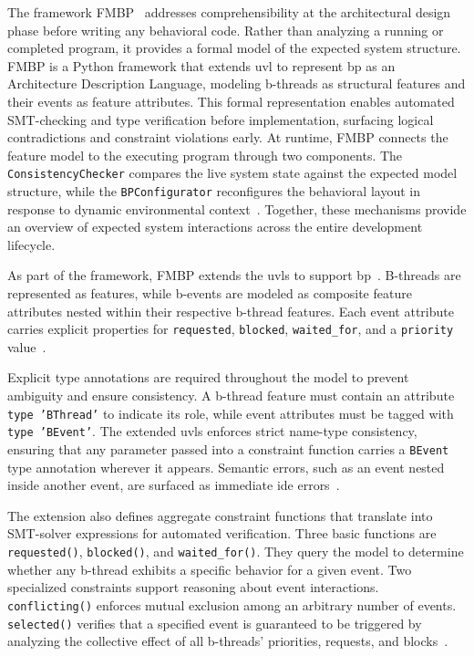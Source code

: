 The framework FMBP~\cite{felber_comprehensible_2025} addresses comprehensibility at the architectural design phase before writing any behavioral code.
Rather than analyzing a running or completed program, it provides a formal model of the expected system structure.
FMBP is a Python framework that extends \gls{uvl} to represent \gls{bp} as an Architecture Description Language, modeling b-threads as structural features and their events as feature attributes.
This formal representation enables automated SMT-checking and type verification before implementation, surfacing logical contradictions and constraint violations early.
At runtime, FMBP connects the feature model to the executing program through two components.
The \texttt{ConsistencyChecker} compares the live system state against the expected model structure, while the \texttt{BPConfigurator} reconfigures the behavioral layout in response to dynamic environmental context~\cite{felber_comprehensible_2025}.
Together, these mechanisms provide an overview of expected system interactions across the entire development lifecycle.
 
As part of the framework, FMBP extends the \gls{uvls} to support \gls{bp}~\cite{felber_tfelbruvl-bp-lsp_2025}.
B-threads are represented as features, while b-events are modeled as composite feature attributes nested within their respective b-thread features.
Each event attribute carries explicit properties for \texttt{requested}, \texttt{blocked}, \texttt{waited\_for}, and a \texttt{priority} value~\cite{felber_comprehensible_2025}.

Explicit type annotations are required throughout the model to prevent ambiguity and ensure consistency.
A b-thread feature must contain an attribute \texttt{type 'BThread'} to indicate its role, while event attributes must be tagged with \texttt{type 'BEvent'}.
The extended \gls{uvls} enforces strict name-type consistency, ensuring that any parameter passed into a constraint function carries a \texttt{BEvent} type annotation wherever it appears.
Semantic errors, such as an event nested inside another event, are surfaced as immediate \gls{ide} errors~\cite{felber_comprehensible_2025}.
 
The extension also defines aggregate constraint functions that translate into SMT-solver expressions for automated verification.
Three basic functions are \texttt{requested()}, \texttt{blocked()}, and \texttt{waited\_for()}.
They query the model to determine whether any b-thread exhibits a specific behavior for a given event.
Two specialized constraints support reasoning about event interactions.
\texttt{conflicting()} enforces mutual exclusion among an arbitrary number of events.
\texttt{selected()} verifies that a specified event is guaranteed to be triggered by analyzing the collective effect of all b-threads' priorities, requests, and blocks~\cite{felber_comprehensible_2025}.

